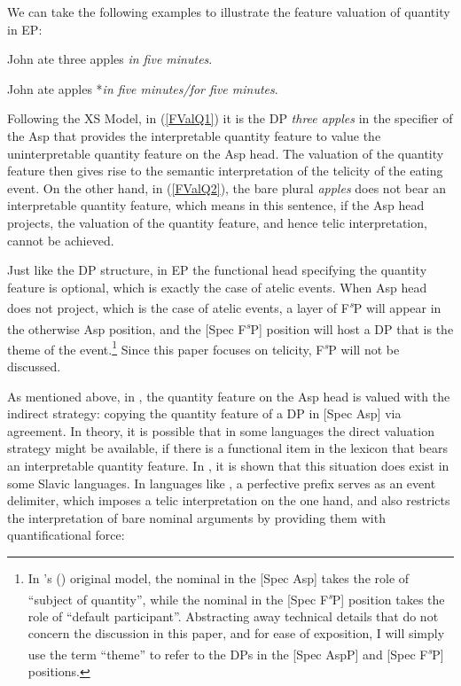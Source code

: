 \documentclass[output=paper]{langsci/langscibook}
\begin{document}
We can take the following examples to illustrate the feature valuation of
quantity in EP:

\begin{exe}
    \ex\label{FValQ1} John ate three apples \emph{in five minutes}.
\end{exe}

\begin{exe}
    \ex\label{FValQ2} John ate apples *\emph{in five minutes/for five minutes}.
\end{exe}

Following the XS Model, in (\ref{FValQ1}) it is the DP \emph{three apples} in
the specifier of the Asp that provides the interpretable quantity
feature to value the uninterpretable quantity feature on the Asp head.
The valuation of the quantity feature then gives rise to the semantic
interpretation of the telicity of the eating event. On the other hand, in
(\ref{FValQ2}), the bare plural \emph{apples} does not bear an interpretable
quantity feature, which means in this sentence, if the Asp head
projects, the valuation of the quantity feature, and hence telic
interpretation, cannot be achieved.

Just like the DP structure, in EP the functional head specifying the quantity
feature is optional, which is exactly the case of atelic events. When
Asp head does not project, which is the case of atelic events, a layer
of F\textsuperscript{\emph{s}}P will appear in the otherwise Asp position, and the [Spec F\textsuperscript{\emph{s}}P]
position will host a DP that is the theme of the event.\footnote{In
\citeauthor{Borer2005b}'s (\citeyear{Borer2005b}) original model, the
nominal in the [Spec Asp] takes the role of ``subject of quantity'',
while the nominal in the [Spec F\textsuperscript{\emph{s}}P] position takes the
role of ``default participant''. Abstracting away technical details that do not
concern the discussion in this paper, and for ease of exposition, I will simply
use the term ``theme'' to refer to the DPs in the [Spec AspP] and [Spec
F\textsuperscript{\emph{s}}P] positions.} Since this paper focuses on telicity,
F\textsuperscript{\emph{s}}P will not be discussed.

As mentioned above, in , the quantity feature on the Asp head is
valued with the indirect strategy: copying the quantity feature of a DP in
[Spec Asp] via agreement. In theory, it is possible that in some
languages the direct valuation strategy might be available, if there is a
functional item in the lexicon that bears an interpretable quantity feature. In
\textcite{Borer2005b}, it is shown that this situation does exist in some
Slavic languages. In languages like , a perfective prefix serves as an
event delimiter, which imposes a telic interpretation on the one hand, and also
restricts the interpretation of bare nominal arguments by providing them with
quantificational force:
\end{document}

